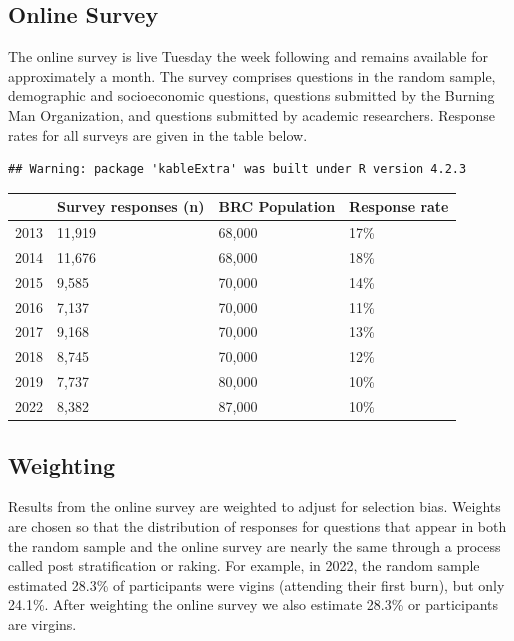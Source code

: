\documentclass[
]{book}
\begin{document}
\hypertarget{online-survey}{%
\subsection{Online Survey}\label{online-survey}}

The online survey is live Tuesday the week following and remains available
for approximately a month. The survey comprises questions in the random
sample, demographic and socioeconomic questions, questions submitted by
the Burning Man Organization, and questions submitted by academic researchers.
Response rates for all surveys are given in the table below.

\begin{verbatim}
## Warning: package 'kableExtra' was built under R version 4.2.3
\end{verbatim}

\begin{table}
\centering
\begin{tabular}[t]{>{}l|l|l|l}
\hline
  & Survey responses (n) & BRC Population & Response rate\\
\hline
2013 & 11,919 & 68,000 & 17\%\\
\hline
2014 & 11,676 & 68,000 & 18\%\\
\hline
2015 & 9,585 & 70,000 & 14\%\\
\hline
2016 & 7,137 & 70,000 & 11\%\\
\hline
2017 & 9,168 & 70,000 & 13\%\\
\hline
2018 & 8,745 & 70,000 & 12\%\\
\hline
2019 & 7,737 & 80,000 & 10\%\\
\hline
2022 & 8,382 & 87,000 & 10\%\\
\hline
\end{tabular}
\end{table}

\hypertarget{weighting}{%
\subsection{Weighting}\label{weighting}}

Results from the online survey are weighted to adjust for selection bias. Weights
are chosen so that the distribution of responses for questions that appear in
both the random sample and the online survey are nearly the same through a
process called post stratification or raking. For example, in 2022, the random
sample estimated 28.3\% of participants were vigins (attending their first burn),
but only 24.1\%. After weighting the online survey we also estimate 28.3\%
or participants are virgins.
\end{document}
